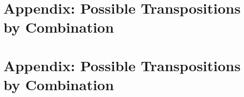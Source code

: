 \documentclass[10pt,twocolumn]{article}
\numberwithin{equation}{section} %
\begin{document}
\vfill\break



\clearpage
\appendix
\section*{Appendix: Possible Transpositions by Combination}

\newcommand{\sone}[1]{\cellcolor{gray!20}{#1}} %
\newcommand{\diag}{\rowcolor{green!12}}        %

\section*{Appendix: Possible Transpositions by Combination}

\setlength{\tabcolsep}{3.5pt} %
\small                         %

\tablelasttail{\bottomrule}


\end{document}
